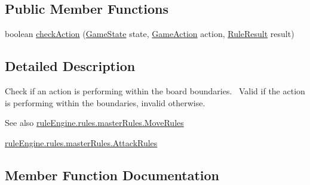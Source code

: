 \subsection*{Public Member Functions}
\begin{DoxyCompactItemize}
\item 
boolean \mbox{\hyperlink{classrule_engine_1_1rules_1_1atomic_rules_1_1_check_on_board_a73df87709e976673d0d42d0935a3a536}{check\+Action}} (\mbox{\hyperlink{classgame_1_1game_state_1_1_game_state}{Game\+State}} state, \mbox{\hyperlink{classrule_engine_1_1_game_action}{Game\+Action}} action, \mbox{\hyperlink{classrule_engine_1_1_rule_result}{Rule\+Result}} result)
\end{DoxyCompactItemize}


\subsection{Detailed Description}
Check if an action is performing within the board boundaries.~\newline
 Valid if the action is performing within the boundaries, invalid otherwise.

\begin{DoxySeeAlso}{See also}
\mbox{\hyperlink{classrule_engine_1_1rules_1_1master_rules_1_1_move_rules}{rule\+Engine.\+rules.\+master\+Rules.\+Move\+Rules}} 

\mbox{\hyperlink{classrule_engine_1_1rules_1_1master_rules_1_1_attack_rules}{rule\+Engine.\+rules.\+master\+Rules.\+Attack\+Rules}} 
\end{DoxySeeAlso}


\subsection{Member Function Documentation}
\mbox{\label{classrule_engine_1_1rules_1_1atomic_rules_1_1_check_on_board_a73df87709e976673d0d42d0935a3a536}} 
